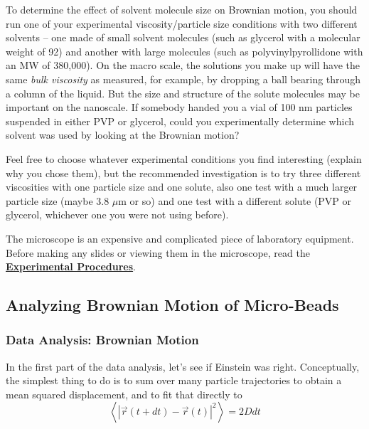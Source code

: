 \documentclass{../lab}
\begin{document}
To determine the effect of solvent molecule size on Brownian motion, you should run one of your experimental viscosity/particle size conditions with two different solvents -- one made of small solvent molecules (such as glycerol with a molecular weight of 92) and another with large molecules (such as polyvinylpyrollidone with an MW of 380,000). On the macro scale, the solutions you make up will have the same \emph{bulk viscosity} as measured, for example, by dropping a ball bearing through a column of the liquid. But the size and structure of the solute molecules may be important on the nanoscale. If somebody handed you a vial of 100 nm particles suspended in either PVP or glycerol, could you experimentally determine which solvent was used by looking at the Brownian motion?

Feel free to choose whatever experimental conditions you find interesting (explain why you chose them), but the recommended investigation is to try three different viscosities with one particle size and one solute, also one test with a much larger particle size (maybe 3.8 $\mu$m or so) and one test with a different solute (PVP or glycerol, whichever one you were not using before).

The microscope is an expensive and complicated piece of laboratory equipment. Before making any slides or viewing them in the microscope, read the \href{https://berkeley-physics111b.github.io/appendices/BMC-Experimental-Procedures/}{\textbf{Experimental Procedures}}.



\subsection{Analyzing Brownian Motion of Micro-Beads}

\subsubsection{Data Analysis: Brownian Motion}

In the first part of the data analysis, let's see if Einstein was right. Conceptually, the simplest thing to do is to sum over many particle trajectories to obtain a mean squared displacement, and to fit that directly to
\[
\left\langle {\left| \vec r(t+dt)-\vec r(t) \right|}^2 \right\rangle = 2 D dt
\]
\end{document}
